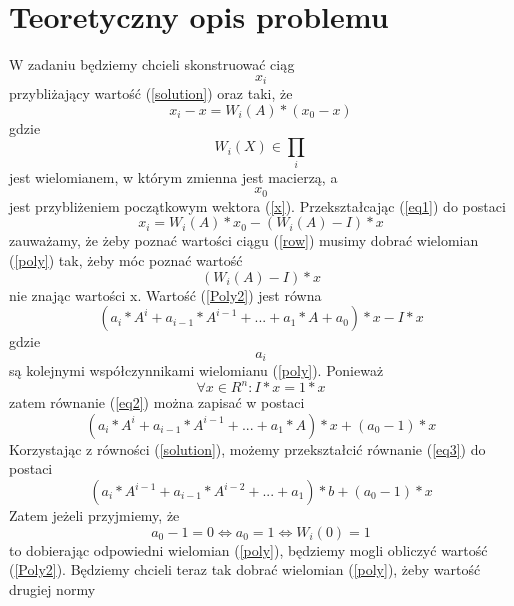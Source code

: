 \documentclass[a4paper]{article}
\begin{document}
\section{Teoretyczny opis problemu}
W zadaniu będziemy chcieli skonstruować ciąg 
\begin{equation}
\label{row}
x_i
\end{equation}
przybliżający wartość (\ref{solution}) oraz taki, że
\begin{equation}
\label{eq1}
x_i-x=W_i(A)*(x_0-x)
\end{equation}
gdzie
\begin{equation}
\label{poly}
W_i(X)\in \prod _i
\end{equation}
jest wielomianem, w którym zmienna jest macierzą, a 
\begin{equation}
x_0
\end{equation} jest przybliżeniem początkowym wektora (\ref{x}). Przekształcając (\ref{eq1}) do postaci 
\begin{equation}
x_i=W_i(A)*x_0-(W_i(A)-I)*x
\end{equation}
zauważamy, że żeby poznać wartości ciągu (\ref{row}) musimy dobrać wielomian (\ref{poly}) tak, żeby móc poznać wartość 
\begin{equation}
\label{Poly2}
(W_i(A)-I)*x
\end{equation}
nie znając wartości x. Wartość (\ref{Poly2}) jest równa
\begin{equation}
\label{eq2}
(a_i*A^i+a_{i-1}*A^{i-1}+...+a_1*A+a_0)*x-I*x
\end{equation}
gdzie
\begin{equation}
a_i
\end{equation}
są kolejnymi współczynnikami wielomianu (\ref{poly}). Ponieważ 
\begin{equation}
\forall x \in R^n: I*x=1*x
\end{equation}
zatem równanie (\ref{eq2}) można zapisać w postaci 
\begin{equation}
\label{eq3}
(a_i*A^i+a_{i-1}*A^{i-1}+...+a_1*A)*x+(a_0-1)*x
\end{equation}
Korzystając z równości (\ref{solution}), możemy przekształcić równanie (\ref{eq3}) do postaci
\begin{equation}
(a_i*A^{i-1}+a_{i-1}*A^{i-2}+...+a_1)*b+(a_0-1)*x
\end{equation}
Zatem jeżeli przyjmiemy, że
\begin{equation}
a_0-1=0 \iff a_0=1  \iff W_i(0)=1
\end{equation}
to dobierając odpowiedni wielomian (\ref{poly}), będziemy mogli obliczyć wartość (\ref{Poly2}). Będziemy chcieli teraz tak dobrać wielomian (\ref{poly}), żeby wartość drugiej normy
\end{document}
